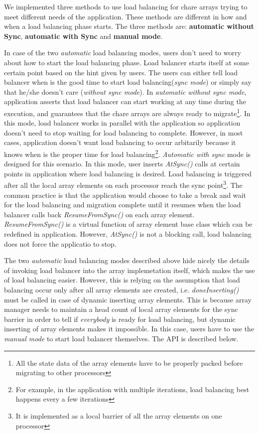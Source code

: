 We implemented three methods to use load balancing for chare arrays
trying to meet different needs of the application. These methods
are different in how and when a load balancing phase starts.
The three methods are: {\bf automatic without Sync}, 
{\bf automatic with Sync} and {\bf manual mode}.

In case of the two {\em automatic} load balancing modes, users don't need 
to worry about how to start the load balancing phase. Load balancer 
starts itself at some certain point based on the hint given by users. 
The users can either tell load balancer when is the good time to start 
load balancing({\em sync mode}) or simply say that he/she doesn't care
({\em without sync mode}). 
In {\em automatic without sync mode}, application asserts
that load balancer can start working at any time during the execution, and 
guarantees that the chare arrays are always ready to 
migrate\footnote{All the state data of the array elements have to be 
properly packed before migrating to 
other processors}. In this mode, load balancer works in parallel with 
the application so application doesn't need to stop waiting for load 
balancing to complete. However, in most cases, 
application doesn't want load balancing to occur arbitarily because it knows 
when is the proper time for load balancing\footnote{For example, in the 
application with multiple iterations, load balancing best happens 
every a few iterations}. {\em Automatic with sync} mode is designed for this 
scenario. In this mode, user inserts {\em AtSync()} calls at certain points 
in application where load balancing is desired. Load balancing is triggered 
after all the local array elements on each processor reach the sync 
point\footnote{It is implemented as a local barrier of all the array elements
on one processor}.  The common practice is that the application 
would choose to take a break and wait for the load balancing and migration 
complete until it resumes when the load balancer calls 
back {\em ResumeFromSync()} on each array element. 
{\em ResumeFromSync()} is a virtual function of array element 
base class which can be redefined in application. However, 
 {\em AtSync()} is not a blocking call, load balancing does
not force the applicatio to stop. 

The two {\em automatic} load balancing modes described above hide nicely
the details of invoking load balancer into the array implemetation itself,
which makes the use of load balancing easier. 
However, this is relying on the assumption that load balancing occur only
after all array elements are created, i.e. {\em doneInserting()} 
must be called in case of dynamic inserting array elements. 
This is because array manager needs to maintain a head count of 
local array elements for the sync barrier
in order to tell if {\it everybody} is ready for load balancing, but
 dynamic inserting of array elements makes it impossible. In this case,
users have to use the {\em manual mode} to start load balancer themselves.
The API is described below.

